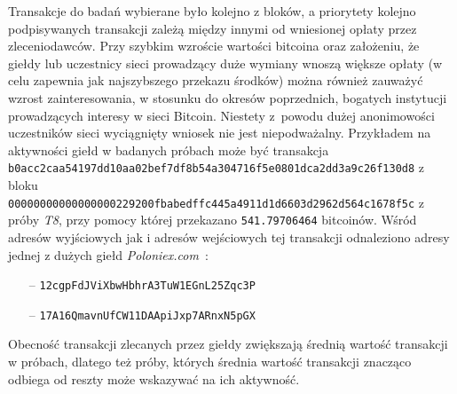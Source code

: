 \documentclass[12pt, oneside, final, openany]{mgr}
\begin{document}
\indent Transakcje do badań wybierane było kolejno z bloków, a priorytety kolejno podpisywanych transakcji zależą między innymi od wniesionej opłaty przez zleceniodawców. Przy szybkim wzroście wartości bitcoina oraz założeniu, że giełdy lub uczestnicy sieci prowadzący duże wymiany wnoszą większe opłaty (w celu zapewnia jak najszybszego przekazu środków) można również zauważyć wzrost zainteresowania, w stosunku do okresów poprzednich, bogatych instytucji prowadzących interesy w sieci Bitcoin. Niestety z~powodu dużej anonimowości uczestników sieci wyciągnięty wniosek nie jest niepodważalny. 
\if@archive\else{\newpage}\fi
\indent Przykładem na aktywności giełd w badanych próbach może być transakcja\\\texttt{b0acc2caa54197dd10aa02bef7df8b54a304716f5e0801dca2dd3a9c26f130d8} z bloku\\ \texttt{00000000000000000229200fbabedffc445a4911d1d6603d2962d564c1678f5c} z próby \textit{T8}, przy pomocy której przekazano \texttt{541.79706464} bitcoinów. Wśród adresów wyjściowych jak i adresów wejściowych tej transakcji odnaleziono adresy jednej z dużych giełd \textit{Poloniex.com}~\cite{poloniex}:
\begin{itemize}
\item[--] \texttt{12cgpFdJViXbwHbhrA3TuW1EGnL25Zqc3P}
\item[--] \texttt{17A16QmavnUfCW11DAApiJxp7ARnxN5pGX}
\end{itemize}
Obecność transakcji zlecanych przez giełdy zwiększają średnią wartość transakcji w próbach, dlatego też próby, których średnia wartość transakcji znacząco odbiega od reszty może wskazywać na ich aktywność.
\end{document}
